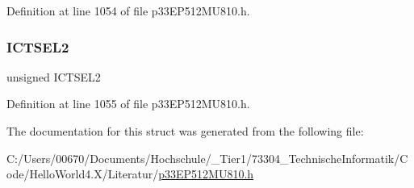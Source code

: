 Definition at line 1054 of file p33\+E\+P512\+M\+U810.\+h.

\mbox{\label{structtag_i_c10_c_o_n1_b_i_t_s_a47d80892d449e6edbd5ba2ba9ff06deb}} 
\subsubsection{\texorpdfstring{I\+C\+T\+S\+E\+L2}{ICTSEL2}}
{\footnotesize\ttfamily unsigned I\+C\+T\+S\+E\+L2}



Definition at line 1055 of file p33\+E\+P512\+M\+U810.\+h.



The documentation for this struct was generated from the following file\+:\begin{DoxyCompactItemize}
\item 
C\+:/\+Users/00670/\+Documents/\+Hochschule/\+\_\+\+Tier1/73304\+\_\+\+Technische\+Informatik/\+Code/\+Hello\+World4.\+X/\+Literatur/\hyperlink{p33_e_p512_m_u810_8h}{p33\+E\+P512\+M\+U810.\+h}\end{DoxyCompactItemize}
